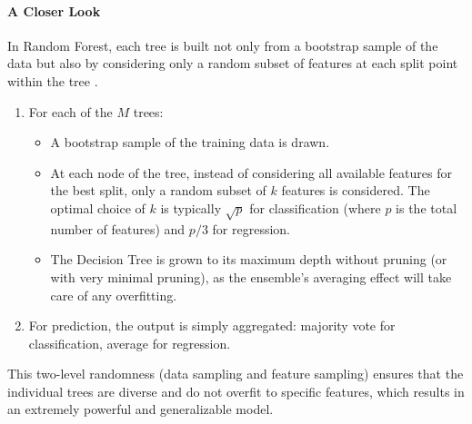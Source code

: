 \paragraph{A Closer Look} 
In Random Forest, each tree is built not only from a bootstrap sample of the data but also by considering only a random subset of features at each split point within the tree \parencite{almutairi2025intrusion}.
\begin{enumerate}[noitemsep] 
\item For each of the $M$ trees: 
\begin{itemize}[noitemsep] 
\item A bootstrap sample of the training data is drawn.
\item At each node of the tree, instead of considering all available features for the best split, only a random subset of $k$ features is considered. The optimal choice of $k$ is typically $\sqrt{p}$ for classification (where $p$ is the total number of features) and $p/3$ for regression.
\item The Decision Tree is grown to its maximum depth without pruning (or with very minimal pruning), as the ensemble's averaging effect will take care of any overfitting.
\end{itemize} 
\item For prediction, the output is simply aggregated: majority vote for classification, average for regression. 
\end{enumerate} 
This two-level randomness (data sampling and feature sampling) ensures that the individual trees are diverse and do not overfit to specific features, which results in an extremely powerful and generalizable model.

